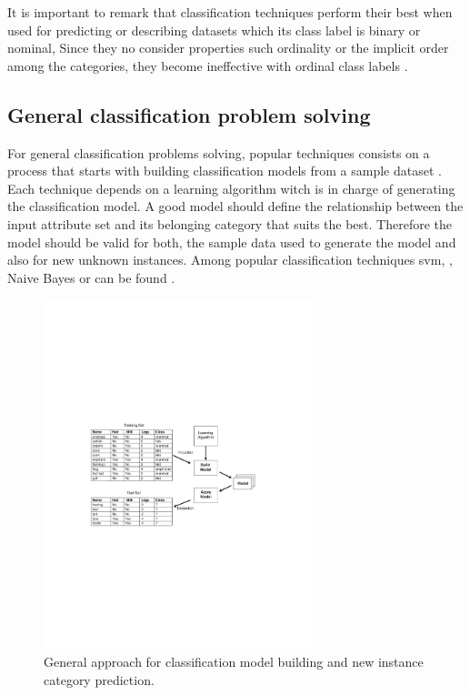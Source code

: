 It is important to remark that classification techniques perform their best when used for predicting or describing datasets which its class label is binary or nominal, Since they no consider properties such ordinality or the implicit order among the categories, they become ineffective with ordinal class labels \cite{frank2001simple}.

\subsection{General classification problem solving}

For general classification problems solving, popular techniques consists on a process that starts with building classification models from a sample dataset \cite{witten2005data}. Each technique depends on a learning algorithm witch is in charge of generating the classification model. A good model should define the relationship between the input attribute set and its belonging category that suits the best. Therefore the model should be valid for both, the sample data used to generate the model and also for new unknown instances. Among popular classification techniques \acrfull{svm}, , Naive Bayes or  can be found \cite{garje2016sentiment}.

\begin{figure}[!htp]
  \center
  \includegraphics[width=0.7\textwidth]{figures/classification_problem_solving}
  \caption{General approach for classification model building and new instance category prediction.}
  \label{fig:classification_problem}
\end{figure}


